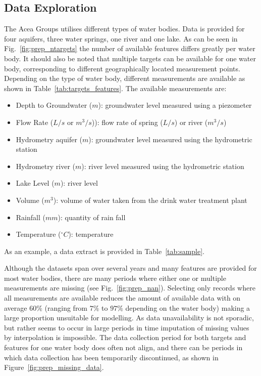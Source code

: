 \documentclass{article}
\begin{document}
\subsection*{Data Exploration}

The Acea Groups utilises different types of water bodies. Data is provided for four aquifers, three water springs, one river and one lake. As can be seen in Fig.~\ref{fig:prep_ntargets} the number of available features differs greatly per water body. It should also be noted that multiple targets can be available for one water body, corresponding to different geographically located measurement points. Depending on the type of water body, different measurements are available as shown in Table~\ref{tab:targets_features}. The available measurements are:

\begin{itemize}
\item Depth to Groundwater ($m$): groundwater level measured using a piezometer
\item Flow Rate ($L/s$ or $m^3/s$)): flow rate of spring ($L/s$) or river ($m^3/s$) 
\item Hydrometry aquifer ($m$): groundwater level measured using the hydrometric station
\item Hydrometry river ($m$): river level measured using the hydrometric station
\item Lake Level ($m$): river level
\item Volume ($m^3$): volume of water taken from the drink water treatment plant
\item Rainfall ($mm$): quantity of rain fall
\item Temperature ($^{\circ}C$): temperature
\end{itemize}

As an example, a data extract is provided in Table~\ref{tab:sample}. 

Although the datasets span over several years and many features are provided for most water bodies, there are many periods where either one or multiple measurements are missing (see Fig.~\ref{fig:prep_nan}). Selecting only records where all measurements are available reduces the amount of available data with on average $60\%$ (ranging from $7\%$ to $97\%$ depending on the water body) making a large proportion unsuitable for modelling. As data unavailability is not sporadic, but rather seems to occur in large periods in time imputation of missing values by interpolation is impossible. The data collection period for both targets and features for one water body does often not align, and there can be periods in which data collection has been temporarily discontinued, as shown in Figure~\ref{fig:prep_missing_data}.
\end{document}
